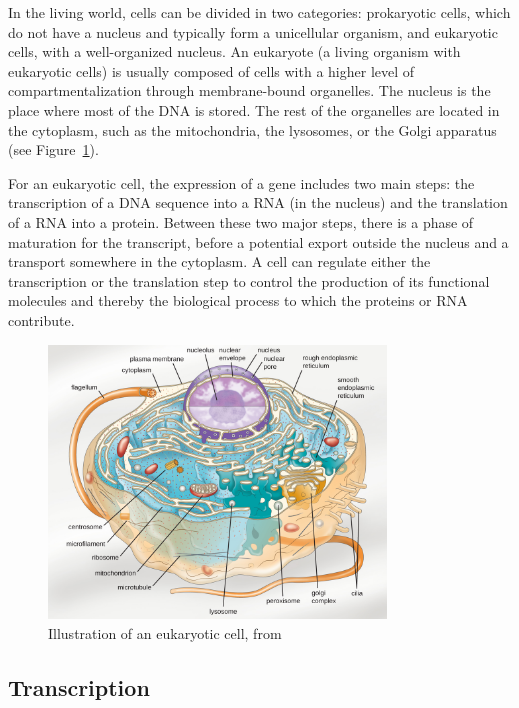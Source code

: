In the living world, cells can be divided in two categories: prokaryotic cells, which do not have a nucleus and typically form a unicellular organism, and eukaryotic cells, with a well-organized nucleus.
An eukaryote (a living organism with eukaryotic cells) is usually composed of cells with a higher level of compartmentalization through membrane-bound organelles.
The nucleus is the place where most of the \ac{DNA} is stored.
The rest of the organelles are located in the cytoplasm, such as the mitochondria, the lysosomes, or the Golgi apparatus (see Figure~\ref{fig:eukaryotic_cell}).

For an eukaryotic cell, the expression of a gene includes two main steps: the transcription of a \ac{DNA} sequence into a \ac{RNA} (in the nucleus) and the translation of a \ac{RNA} into a protein.
Between these two major steps, there is a phase of maturation for the transcript, before a potential export outside the nucleus and a transport somewhere in the cytoplasm.
A cell can regulate either the transcription or the translation step to control the production of its functional molecules and thereby the biological process to which the proteins or \ac{RNA} contribute.

\begin{figure}[]
    \centering
    \includegraphics[width=0.8\textwidth]{figures/introduction/cell_eukaryotic.jpg}
    \caption[Illustration of an eukaryotic cell]{Illustration of an eukaryotic cell, from~\cite{parker2017microbiology}}
    \label{fig:eukaryotic_cell}
\end{figure}

\subsection{Transcription}
\label{subsec:intro_transcription}

